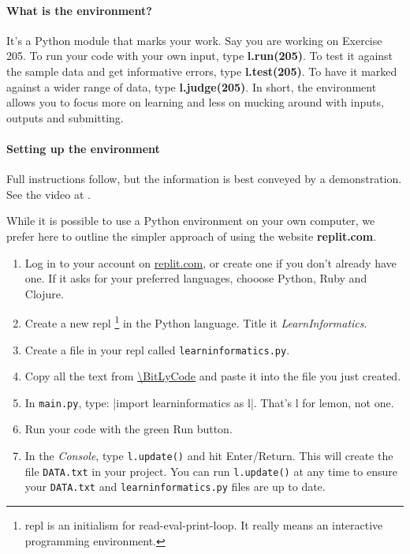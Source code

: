\paragraph{What is the \learninformatics{} environment?} It's a Python module that marks
your work. Say you are working on Exercise 205. To run your code with your own input, type
\textbf{l.run(205)}. To test it against the sample data and get informative errors, type
\textbf{l.test(205)}. To have it marked against a wider range of data, type
\textbf{l.judge(205)}. In short, the \learninformatics{} environment allows you to focus
more on learning and less on mucking around with inputs, outputs and submitting.

\paragraph{Setting up the \learninformatics{} environment} Full instructions follow, but the
information is best conveyed by a demonstration. See the video at .

While it is possible to use a Python environment on your own computer, we prefer here to
outline the simpler approach of using the website \textbf{replit.com}.

\begin{enumerate}
  \item Log in to your account on \url{replit.com}, or create one if you don't already
    have one.  If it asks for your preferred languages, chooose Python, Ruby and Clojure.
  \item Create a new repl%
\footnote{repl is an initialism for read-eval-print-loop. It really means an interactive
  programming environment.}
    in the Python language. Title it \emph{LearnInformatics}.
  \item Create a file in your repl called \texttt{learninformatics.py}.
  \item Copy all the text from \url{\BitLyCode} and paste it into the file you just created.
  \item In \texttt{main.py}, type: \pycode|import learninformatics as l|.
    {\small\color{Fuchsia}That's l for lemon, not one.}
  \item Run your code with the green Run button.
  \item In the \emph{Console}, type \texttt{l.update()} and hit Enter/Return. This will
    create the file \texttt{DATA.txt} in your project. You can run \texttt{l.update()} at
    any time to ensure your \texttt{DATA.txt} and \texttt{learninformatics.py} files are
    up to date.
\end{enumerate}

